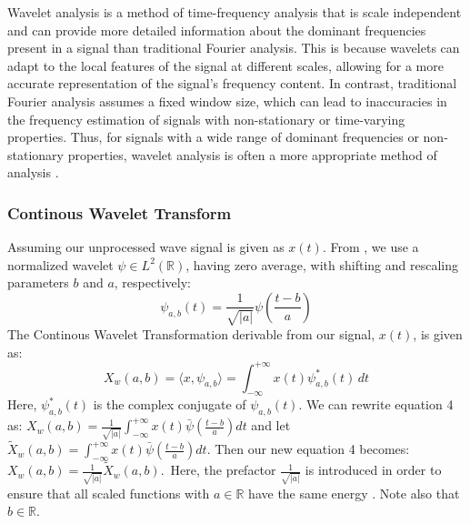 \documentclass[conference]{IEEEtran}
\begin{document}
Wavelet analysis is a method of time-frequency analysis that is scale independent and can provide more detailed information about the dominant frequencies present in a signal than traditional Fourier analysis. This is because wavelets can adapt to the local features of the signal at different scales, allowing for a more accurate representation of the signal's frequency content. In contrast, traditional Fourier analysis assumes a fixed window size, which can lead to inaccuracies in the frequency estimation of signals with non-stationary or time-varying properties. Thus, for signals with a wide range of dominant frequencies or non-stationary properties, wavelet analysis is often a more appropriate method of analysis \cite{APracticalGuidetoWaveletAnalysis}.



\subsubsection{Continous Wavelet Transform}Assuming our unprocessed wave signal is given as $x(t)$. From \cite{mertins1999signal}\cite{pereyra2012harmonic}, we use a normalized wavelet $\psi \in L^2(\mathbb{R})$, having zero average, with shifting and rescaling parameters $b$ and $a$, respectively:\begin{equation} \psi_{a,b}(t) = \frac{1}{\sqrt{|a|}} \psi\left(\frac{t-b}{a}\right)\end{equation}The Continous Wavelet Transformation derivable from our signal, $x(t)$, is given as:\begin{equation} X_{w}(a,b) = \langle x, \psi_{a,b} \rangle =\int_{-\infty}^{+\infty} x(t) \psi_{a,b}^{*}(t) \, dt\end{equation}Here, $\psi_{a,b}^{*}(t)$ is the complex conjugate of $\psi_{a,b}(t)$. We can rewrite equation 4 as: $X_{w}(a,b) = \frac{1}{\sqrt{|a|}}\int_{-\infty}^{+\infty} x(t) \bar{\psi}\left(\frac{t-b}{a}\right) dt$ and let $\tilde{X}_{w}(a,b)=\int_{-\infty}^{+\infty} x(t) \bar{\psi}\left(\frac{t-b}{a}\right) dt$. Then our new equation 4 becomes: $X_{w}(a,b)=\frac{1}{\sqrt{|a|}}\tilde{X}_{w}(a,b)$. Here, the prefactor $\frac{1}{\sqrt{|a|}}$ is introduced in order to ensure that all scaled functions with $a\in\mathbb{R}$ have the same energy \cite{mertins1999signal}\cite{Roy_2022}\cite{APracticalGuidetoWaveletAnalysis}. Note also that $b\in\mathbb{R}$.
\end{document}
